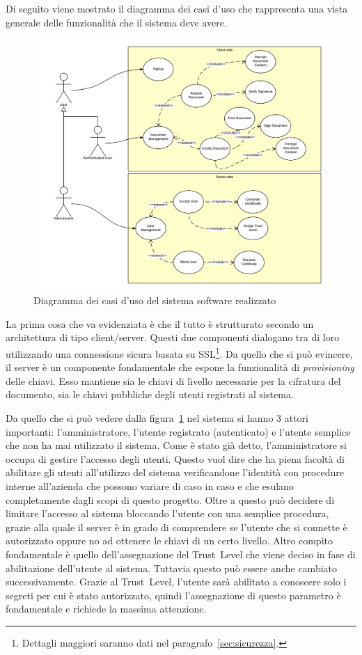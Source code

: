 Di seguito viene mostrato il diagramma dei casi d'uso che rappresenta una vista generale delle funzionalità che il sistema deve avere.
	\begin{center}	
		\begin{figure}[H]
		\centering
		\includegraphics[scale=0.9]{Immagini/usecase}
		\caption[Use Case Diagram]{Diagramma dei casi d'uso del sistema software realizzato}
		\label{fig:usecase}
		\end{figure}
	\end{center}
La prima cosa che va evidenziata è che il tutto è strutturato secondo un architettura di tipo client/server. Questi due componenti dialogano tra di loro utilizzando una connessione sicura basata su SSL\footnote{Dettagli maggiori saranno dati nel paragrafo~\ref{sec:sicurezza}.}. Da quello che si può evincere, il server è un componente fondamentale che espone la funzionalità di \emph{provisioning} delle chiavi. Esso mantiene sia le chiavi di livello necessarie per la cifratura del documento, sia le chiavi pubbliche degli utenti registrati al sistema.

Da quello che si può vedere dalla figura~\ref{fig:usecase} nel sistema si hanno 3 attori importanti: l'amministratore, l'utente registrato (autenticato) e l'utente semplice che non ha mai utilizzato il sistema.
Come è stato già detto, l'amministratore si occupa di gestire l'accesso degli utenti. Questo vuol dire che ha piena facoltà di abilitare gli utenti all'utilizzo del sistema verificandone l'identità con procedure interne all'azienda che possono variare di caso in caso e che esulano completamente dagli scopi di questo progetto.
Oltre a questo può decidere di limitare l'accesso al sistema bloccando l'utente con una semplice procedura, grazie alla quale il server è in grado di comprendere se l'utente che si connette è autorizzato oppure no ad ottenere le chiavi di un certo livello.
Altro compito fondamentale è quello dell'assegnazione del Trust~Level che viene deciso in fase di abilitazione dell'utente al sistema. Tuttavia questo può essere anche cambiato successivamente. Grazie al Trust~Level, l'utente sarà abilitato a conoscere solo i segreti per cui è stato autorizzato, quindi l'assegnazione di questo parametro è fondamentale e richiede la massima attenzione.

